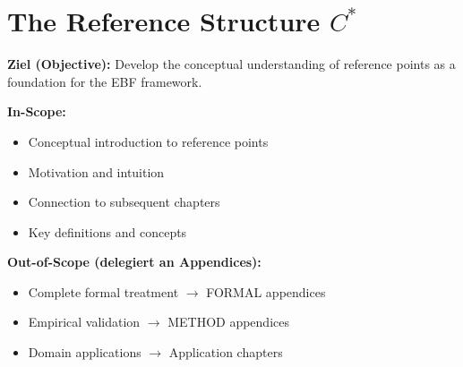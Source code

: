%
%
%
%

\chapter{The Reference Structure $C^*$}
\label{ch:reference-structure}

\begin{tcolorbox}[
    colback=purple!5!white,
    colframe=purple!75!black,
    title={\textbf{Chapter Scope: Ziel / In-Scope / Out-of-Scope}},
    fonttitle=\bfseries
]

\textbf{Ziel (Objective):}
Develop the conceptual understanding of reference points as a foundation for the EBF framework.

\vspace{0.3cm}
\textbf{In-Scope:}
\begin{itemize}[nosep]
    \item Conceptual introduction to reference points
    \item Motivation and intuition
    \item Connection to subsequent chapters
    \item Key definitions and concepts
\end{itemize}

\vspace{0.3cm}
\textbf{Out-of-Scope (delegiert an Appendices):}
\begin{itemize}[nosep]
    \item Complete formal treatment $\rightarrow$ FORMAL appendices
    \item Empirical validation $\rightarrow$ METHOD appendices
    \item Domain applications $\rightarrow$ Application chapters
\end{itemize}

\end{tcolorbox}




